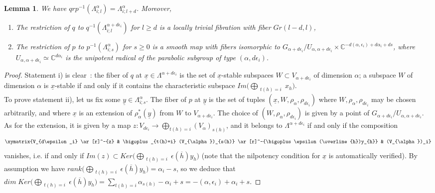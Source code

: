 \documentclass[a4paper,10pt]{amsart}
\def\a{\alpha}
\def\C{\mathbb{C}}
\newtheorem{lem}[theo]{Lemma}
\numberwithin{equation}{section}
\begin{document}
\begin{lem}\label{L:lambdadim} We have $qrp^{-1}(\Lambda^{\a}_{i;l}) = \Lambda^{\a}_{i;l+d}$. Moreover,
\begin{enumerate}
\item[i)] The restriction of $q$ to $q^{-1}(\Lambda^{\a+d\epsilon_i}_{i;l})$ for $l \geq d$ is a locally
trivial fibration with fiber $Gr(l-d,l)$,
\item[ii)] The restriction of $p$ to $p^{-1}(\Lambda^{\a}_{i;s})$ for $s \geq 0$ is a smooth map with fibers isomorphic to $G_{\a+d\epsilon_i}/U_{\a,\a+d\epsilon_i} \times \C^{-d(\a,\epsilon_i) +d\a_i +ds}$, where
$U_{\a,\a+d\epsilon_i} \simeq \C^{d\a_i}$ is the unipotent radical of the parabolic subgroup of type $(\a,d\epsilon_i)$.
\end{enumerate}
\end{lem}
\begin{proof} Statement i) is clear~: the fiber of $q$ at $\underline{x} \in \Lambda^{\a+d\epsilon_i}$ is the set of $\underline{x}$-stable subspaces $W \subset V_{\a+d\epsilon_i}$ of dimension $\a$; a subspace $W$ of dimension $\a$ is $\underline{x}$-stable if and only if it contains the characteristic subspace $Im\big( \bigoplus_{\substack{t(h)=i}} x_h \big)$.\\
To prove statement ii), let us fix some $\underline{y} \in \Lambda^{\a}_{i;s}$. The fiber of $p$ at $\underline{y}$ is the set of tuples $(\underline{x}, W, \rho_{\a}, \rho_{d\epsilon_i})$ where $W, \rho_{\a}, \rho_{d\epsilon_i}$ may be chosen arbitrarily, and where $\underline{x}$ is an extension of $\rho_{\a}^*(\underline{y})$ from $W$ to $V_{\a+d\epsilon_i}$. The choice of $(W,\rho_{\a}, \rho_{d\epsilon_i})$ is given by a point of $G_{\a+d\epsilon_i}/U_{\a,\a+d\epsilon_i}$.
As for the extension, it is given by a map
$z: V_{d\epsilon_i} \to \bigoplus_{ t(h)=i} (V_{\a})_{s(h)}$, and it belongs to $\Lambda^{\a+d\epsilon_i}$ if and only if the composition
$$\xymatrix{V_{d\epsilon_i} \ar[r]^-{z} & \bigoplus_{t(h)=i} (V_{\a})_{s(h)} \ar[r]^-{\bigoplus \epsilon(\overline{h})y_{h}} & (V_{\a})_i}$$ 
vanishes, i.e. if and only if $Im(z) \subset Ker \big( \bigoplus_{\substack{ t(h)=i}} \epsilon(\overline{h})y_h\big)$
(note that the nilpotency condition for $\underline{x}$ is automatically verified). By assumption
we have $rank\big( \bigoplus_{\substack{ t(h)=i}} \epsilon(\overline{h})y_h\big)=\a_i-s$, so we deduce that $dim\;Ker\big( \bigoplus_{\substack{ t(h)=i}} \epsilon(\overline{h})y_h\big)=\sum_{t(h)=i} \a_{s(h)}-\a_i+s =-(\a,\epsilon_i) + \a_i +s$. 
\end{proof}
\end{document}
